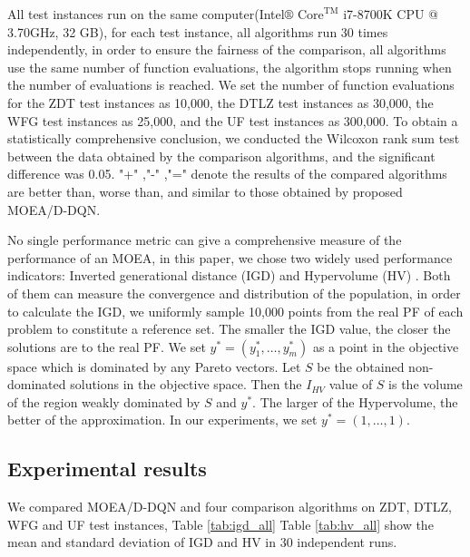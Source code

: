 \documentclass[journal]{IEEEtran}
\begin{document}
All test instances run on the same computer(Intel$\circledR$ $\text{Core}^{\text{TM}}$ i7-8700K CPU @ 3.70GHz, 32 GB), for each test instance, all algorithms run 30 times independently, in order to ensure the fairness of the comparison, all algorithms use the same number of function evaluations,
the algorithm stops running when the number of evaluations is reached.
We set the number of function evaluations for the ZDT test instances as 10,000, the DTLZ test instances as 30,000, the WFG test instances as 25,000, and the UF test instances as 300,000.
To obtain a statistically comprehensive conclusion, we conducted the Wilcoxon rank sum test between the data obtained by the comparison algorithms, and the significant difference was 0.05.
"+" ,"-" ,"=" denote the results of the compared algorithms are better than, worse than, and similar to those obtained by proposed MOEA/D-DQN.

No single performance metric can give a comprehensive measure of the performance of an MOEA, in this paper, we chose two widely used performance indicators: Inverted generational distance (IGD) \cite{igd} and Hypervolume (HV) \cite{hv}.
Both of them can measure the convergence and distribution of the population, in order to calculate the IGD, we uniformly sample 10,000 points from the real PF of each problem to constitute a reference set. The smaller the IGD value, the closer the solutions are to the real PF.
We set $y^* = (y^*_1, \dots, y^*_m)$ as a point in the objective space which is dominated by any Pareto vectors. Let $S$ be the obtained non-dominated solutions in the objective space. Then the $I_{HV}$ value of $S$ is the volume of the region weakly dominated by $S$ and $y^*$. The larger of the Hypervolume, the better of the approximation. In our experiments, we set $y^* = (1,\dots, 1).$

\subsection{Experimental results}
We compared MOEA/D-DQN and four comparison algorithms on ZDT, DTLZ, WFG and UF test instances, Table \ref{tab:igd_all} Table \ref{tab:hv_all} show the mean and standard deviation of IGD and HV in 30 independent runs.
\end{document}

